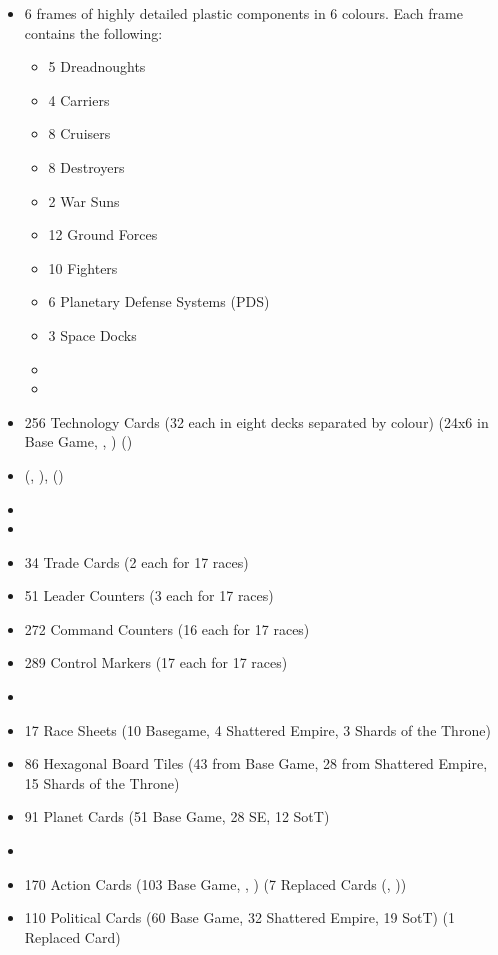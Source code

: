 \documentclass[11pt,fleqn]{book} %
\begin{document}
\begin{itemize}
\item 6  frames of highly detailed plastic components in 6 colours. Each frame contains the following:
\begin{itemize}
\item 5 Dreadnoughts
\item 4 Carriers
\item 8 Cruisers
\item 8 Destroyers
\item 2 War Suns
\item 12 Ground Forces
\item 10 Fighters
\item 6 Planetary Defense Systems (PDS)
\item 3 Space Docks
\item {}
\item {}
\end{itemize}
\item 256 Technology Cards (32 each in eight decks separated by colour) (24x6 in Base Game, , ) ()
\item {} (, ), ()
\item {}
\item {}
\item 34 Trade Cards (2 each for 17 races)
\item 51 Leader Counters (3 each for 17 races)
\item 272 Command Counters (16 each for 17 races)
\item 289 Control Markers (17 each for 17 races)
\item {}
\item 17 Race Sheets (10 Basegame, 4 Shattered Empire, 3 Shards of the Throne)
\item 86 Hexagonal Board Tiles (43 from Base Game, 28 from Shattered Empire, 15 Shards of the Throne) 
\item 91 Planet Cards (51 Base Game, 28 SE, 12 SotT)
\item {}
\item 170 Action Cards (103 Base Game, , ) (7 Replaced Cards (, ))
\item 110 Political Cards (60 Base Game, 32 Shattered Empire, 19 SotT) (1 Replaced Card)

\end{itemize}
\end{document}
